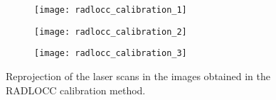 \begin{figure}[h]
    
    \centering
    \begin{subfigure}{0.3\textwidth}
        \texttt{[image: radlocc\_calibration\_1]}
    \end{subfigure}%
    \begin{subfigure}{0.3\textwidth}
        \texttt{[image: radlocc\_calibration\_2]}
    \end{subfigure}%
    \begin{subfigure}{0.3\textwidth}
        \texttt{[image: radlocc\_calibration\_3]}
    \end{subfigure}%

    \caption{Reprojection of the laser scans in the images obtained in the RADLOCC calibration method.}

    \label{figure:radlocc-reprojection}

\end{figure}

